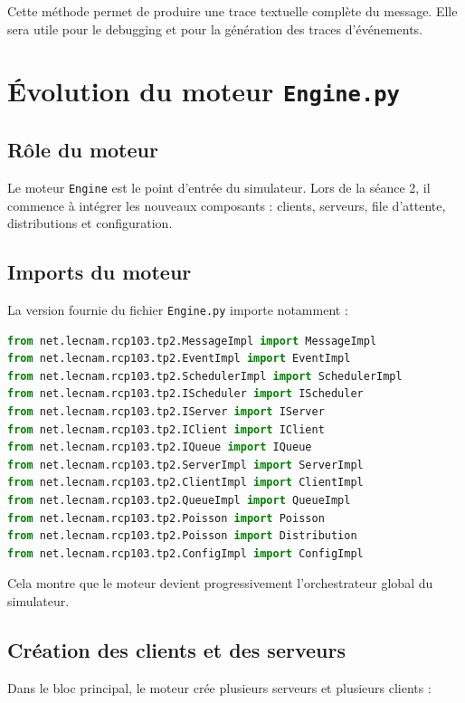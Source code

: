 \documentclass{article}
\begin{document}
Cette méthode permet de produire une trace textuelle complète du message. Elle sera utile pour le debugging et pour la génération des traces d’événements.

\section{Évolution du moteur \texttt{Engine.py}}

\subsection{Rôle du moteur}

Le moteur \texttt{Engine} est le point d’entrée du simulateur. Lors de la séance 2, il commence à intégrer les nouveaux composants : clients, serveurs, file d’attente, distributions et configuration.

\subsection{Imports du moteur}

La version fournie du fichier \texttt{Engine.py} importe notamment :

\begin{lstlisting}[language=Python, caption=Imports principaux de Engine.py]
from net.lecnam.rcp103.tp2.MessageImpl import MessageImpl
from net.lecnam.rcp103.tp2.EventImpl import EventImpl
from net.lecnam.rcp103.tp2.SchedulerImpl import SchedulerImpl
from net.lecnam.rcp103.tp2.IScheduler import IScheduler
from net.lecnam.rcp103.tp2.IServer import IServer
from net.lecnam.rcp103.tp2.IClient import IClient
from net.lecnam.rcp103.tp2.IQueue import IQueue
from net.lecnam.rcp103.tp2.ServerImpl import ServerImpl
from net.lecnam.rcp103.tp2.ClientImpl import ClientImpl
from net.lecnam.rcp103.tp2.QueueImpl import QueueImpl
from net.lecnam.rcp103.tp2.Poisson import Poisson
from net.lecnam.rcp103.tp2.Poisson import Distribution
from net.lecnam.rcp103.tp2.ConfigImpl import ConfigImpl
\end{lstlisting}

Cela montre que le moteur devient progressivement l’orchestrateur global du simulateur.

\subsection{Création des clients et des serveurs}

Dans le bloc principal, le moteur crée plusieurs serveurs et plusieurs clients :
\end{document}
